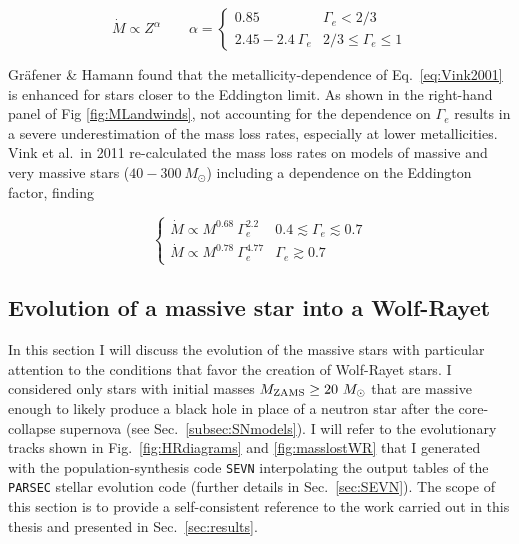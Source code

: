 \documentclass[a4paper,titlepage]{book}     	%
\newcommand{\sun}{\ensuremath{_\odot}}
\newcommand{\mzams}{M_\textup{ZAMS}}
\newcommand{\msun}{\ensuremath{M\sun}}
\begin{document}
\begin{equation}\label{eqn:WRwindGH2008}
\dot M \propto Z^{\alpha} \quad \quad  \alpha = 
\begin{cases}
0.85 & \Gamma_e < 2/3 \\
2.45-2.4~\Gamma_e & 2/3 \leq \Gamma_e \leq 1
\end{cases}
\end{equation}

Gr{\"a}fener \& Hamann found that the metallicity-dependence of Eq.\ \ref{eq:Vink2001} is enhanced for stars closer to the Eddington limit. As shown in the right-hand panel of Fig \ref{fig:MLandwinds}, not accounting for the dependence on $\Gamma_e$ results in a severe underestimation of the mass loss rates, especially at lower metallicities.\\

Vink et al.\ in 2011 \cite{Vink2011} re-calculated the mass loss rates on models of massive and very massive stars ($40-300~\msun$) including a dependence on the Eddington factor, finding

\begin{equation}\label{eqn:Vink2011}
\begin{cases}
\dot M \propto M^{0.68}\ \Gamma_e^{2.2} & 0.4 \lesssim \Gamma_e \lesssim 0.7 \\
\dot M \propto M^{0.78}\ \Gamma_e^{4.77} & \Gamma_e \gtrsim 0.7
\end{cases}
\end{equation}






\subsection{Evolution of a massive star into a Wolf-Rayet}\label{subsec:stellarevo}

In this section I will discuss the evolution of the massive stars with particular attention to the conditions that favor the creation of Wolf-Rayet stars. I considered only stars with initial masses $\mzams \geq 20~\msun$ that are massive enough to likely produce a black hole in place of a neutron star after the core-collapse supernova (see Sec.\ \ref{subsec:SNmodels}). I will refer to the evolutionary tracks shown in Fig.\ \ref{fig:HRdiagrams} and \ref{fig:masslostWR} that I generated with the population-synthesis code \texttt{SEVN} \cite{spera2019_mergingBBH} interpolating the output tables of the \texttt{PARSEC} stellar evolution code \cite{parsec2015_chen} (further details in Sec.\ \ref{sec:SEVN}). The scope of this section is to provide a self-consistent reference to the work carried out in this thesis and presented in Sec.\ \ref{sec:results}. 
\end{document}
